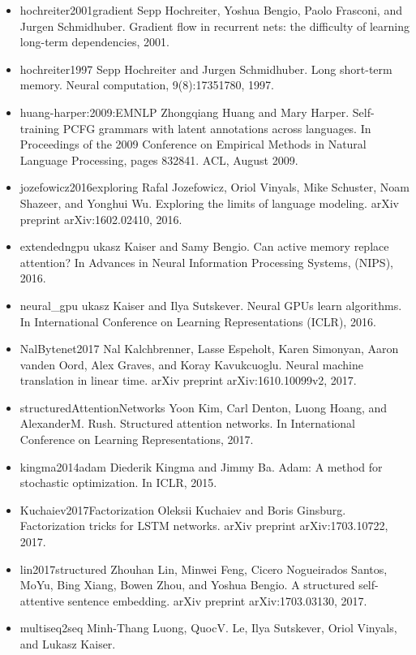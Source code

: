 \documentclass[11pt,a4paper]{article}
\begin{document}
\begin{itemize}
In Proceedings of the IEEE Conference on Computer Vision and
 Pattern Recognition, pages 770778, 2016.
\item hochreiter2001gradient
Sepp Hochreiter, Yoshua Bengio, Paolo Frasconi, and Jurgen Schmidhuber.
Gradient flow in recurrent nets: the difficulty of learning long-term
  dependencies, 2001.
\item hochreiter1997
Sepp Hochreiter and Jurgen Schmidhuber.
Long short-term memory.
Neural computation, 9(8):17351780, 1997.
\item huang-harper:2009:EMNLP
Zhongqiang Huang and Mary Harper.
Self-training PCFG grammars with latent annotations across
  languages.
In Proceedings of the 2009 Conference on Empirical Methods in
 Natural Language Processing, pages 832841. ACL, August 2009.
\item jozefowicz2016exploring
Rafal Jozefowicz, Oriol Vinyals, Mike Schuster, Noam Shazeer, and Yonghui Wu.
Exploring the limits of language modeling.
arXiv preprint arXiv:1602.02410, 2016.
\item extendedngpu
ukasz Kaiser and Samy Bengio.
Can active memory replace attention?
In Advances in Neural Information Processing Systems, (NIPS),
  2016.
\item neural\_gpu
ukasz Kaiser and Ilya Sutskever.
Neural GPUs learn algorithms.
In International Conference on Learning Representations
 (ICLR), 2016.
\item NalBytenet2017
Nal Kalchbrenner, Lasse Espeholt, Karen Simonyan, Aaron vanden Oord, Alex
  Graves, and Koray Kavukcuoglu.
Neural machine translation in linear time.
arXiv preprint arXiv:1610.10099v2, 2017.
\item structuredAttentionNetworks
Yoon Kim, Carl Denton, Luong Hoang, and AlexanderM. Rush.
Structured attention networks.
In International Conference on Learning Representations, 2017.
\item kingma2014adam
Diederik Kingma and Jimmy Ba.
Adam: A method for stochastic optimization.
In ICLR, 2015.
\item Kuchaiev2017Factorization
Oleksii Kuchaiev and Boris Ginsburg.
Factorization tricks for LSTM networks.
arXiv preprint arXiv:1703.10722, 2017.
\item lin2017structured
Zhouhan Lin, Minwei Feng, Cicero Nogueirados Santos, MoYu, Bing Xiang, Bowen
  Zhou, and Yoshua Bengio.
A structured self-attentive sentence embedding.
arXiv preprint arXiv:1703.03130, 2017.
\item multiseq2seq
Minh-Thang Luong, QuocV. Le, Ilya Sutskever, Oriol Vinyals, and Lukasz Kaiser.

\end{itemize}
\end{document}

